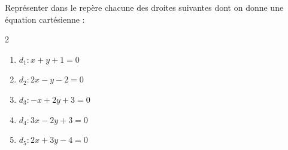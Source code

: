 \begin{exo}{}
	Représenter dans le repère chacune des droites suivantes dont on donne une équation cartésienne :
	\vspace*{-2mm}
	\begin{multicols}{2}
		\begin{enumerate}
			\item $d_1 : x + y + 1 = 0$
			\item $d_2 : 2x - y - 2 = 0$
			\item $d_3 : -x + 2y + 3 = 0$
			\item $d_4 : 3x - 2y + 3 = 0$
			\item $d_5 : 2x + 3y - 4 = 0$
		\end{enumerate}
	\end{multicols}
\end{exo}
